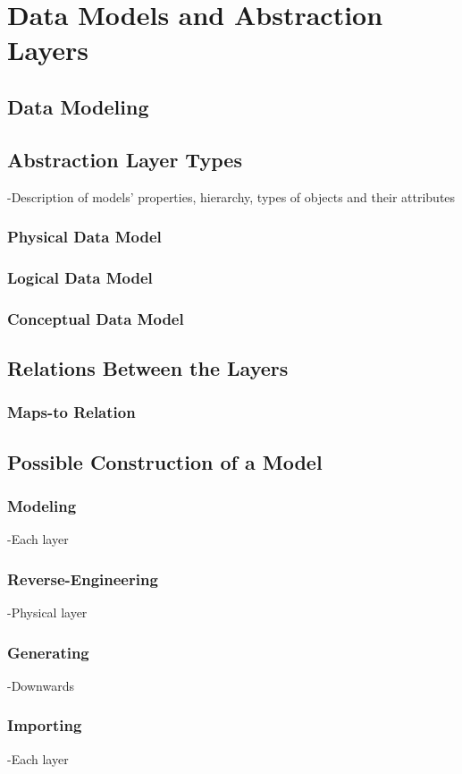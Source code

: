 \chapter{Data Models and Abstraction Layers}

\section{Data Modeling}

\section{Abstraction Layer Types}

-Description of models’ properties, hierarchy, types of objects and their attributes

\subsection{Physical Data Model}

\subsection{Logical Data Model}

\subsection{Conceptual Data Model}

\section{Relations Between the Layers}

\subsection{Maps-to Relation}

\section{Possible Construction of a Model}

\subsection{Modeling}
-Each layer

\subsection{Reverse-Engineering}
-Physical layer

\subsection{Generating}
-Downwards 

\subsection{Importing}
-Each layer
